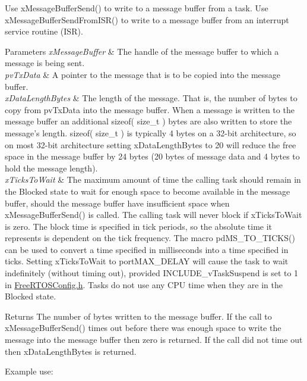 \begin{DoxyPre}
\begin{DoxyPre}   Use xMessageBufferSend() to write to a message buffer from a task.  Use
   xMessageBufferSendFromISR() to write to a message buffer from an interrupt
   service routine (ISR).\end{DoxyPre}
\end{DoxyPre}



\begin{DoxyPre}
\begin{DoxyPre}
\begin{DoxyParams}{Parameters}
{\em xMessageBuffer} & The handle of the message buffer to which a message is
   being sent.\\
\hline
{\em pvTxData} & A pointer to the message that is to be copied into the
   message buffer.\\
\hline
{\em xDataLengthBytes} & The length of the message.  That is, the number of
   bytes to copy from pvTxData into the message buffer.  When a message is
   written to the message buffer an additional sizeof( size\_t ) bytes are also
   written to store the message's length.  sizeof( size\_t ) is typically 4 bytes
   on a 32-bit architecture, so on most 32-bit architecture setting
   xDataLengthBytes to 20 will reduce the free space in the message buffer by 24
   bytes (20 bytes of message data and 4 bytes to hold the message length).\\
\hline
{\em xTicksToWait} & The maximum amount of time the calling task should remain
   in the Blocked state to wait for enough space to become available in the
   message buffer, should the message buffer have insufficient space when
   xMessageBufferSend() is called.  The calling task will never block if
   xTicksToWait is zero.  The block time is specified in tick periods, so the
   absolute time it represents is dependent on the tick frequency.  The macro
   pdMS\_TO\_TICKS() can be used to convert a time specified in milliseconds into
   a time specified in ticks.  Setting xTicksToWait to portMAX\_DELAY will cause
   the task to wait indefinitely (without timing out), provided
   INCLUDE\_vTaskSuspend is set to 1 in \mbox{\hyperlink{_free_r_t_o_s_config_8h_source}{FreeRTOSConfig.h}}.  Tasks do not use any
   CPU time when they are in the Blocked state.\\
\hline
\end{DoxyParams}
\begin{DoxyReturn}{Returns}
The number of bytes written to the message buffer.  If the call to
   xMessageBufferSend() times out before there was enough space to write the
   message into the message buffer then zero is returned.  If the call did not
   time out then xDataLengthBytes is returned.
\end{DoxyReturn}
Example use:


\end{DoxyPre}
\end{DoxyPre}
